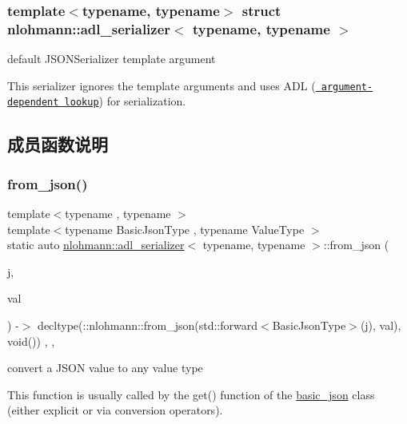\subsubsection*{template$<$typename, typename$>$\newline
struct nlohmann\+::adl\+\_\+serializer$<$ typename, typename $>$}

default J\+S\+O\+N\+Serializer template argument 

This serializer ignores the template arguments and uses A\+DL (\href{https://en.cppreference.com/w/cpp/language/adl}{\texttt{ argument-\/dependent lookup}}) for serialization. 

\subsection{成员函数说明}
\mbox{\label{structnlohmann_1_1adl__serializer_a2c544585b8b1828a0f1eecd831d0496e}} 
\subsubsection{\texorpdfstring{from\_json()}{from\_json()}}
{\footnotesize\ttfamily template$<$typename , typename $>$ \\
template$<$typename Basic\+Json\+Type , typename Value\+Type $>$ \\
static auto \mbox{\hyperlink{structnlohmann_1_1adl__serializer}{nlohmann\+::adl\+\_\+serializer}}$<$ typename, typename $>$\+::from\+\_\+json (\begin{DoxyParamCaption}\item[{Basic\+Json\+Type \&\&}]{j,  }\item[{Value\+Type \&}]{val }\end{DoxyParamCaption}) -\/$>$ decltype(\+::nlohmann\+::from\+\_\+json(std\+::forward$<$Basic\+Json\+Type$>$(j), val), void())
    \hspace{0.3cm}{\ttfamily [inline]}, {\ttfamily [static]}, {\ttfamily [noexcept]}}



convert a J\+S\+ON value to any value type 

This function is usually called by the {\ttfamily get()} function of the \mbox{\hyperlink{classnlohmann_1_1basic__json}{basic\+\_\+json}} class (either explicit or via conversion operators).


